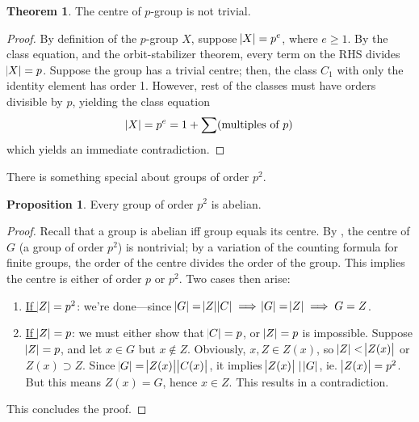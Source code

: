 \documentclass[11pt]{amsart} %
\theoremstyle{definition}
\newtheorem{proposition}[definition]{Proposition}
\newtheorem{theorem}[definition]{Theorem}
\theoremstyle{definition}
\numberwithin{equation}{section}
\begin{document}
\begin{theorem}
	\label{thmcentreofpgroupisnottrivial}
	The centre of $p$-group is not trivial.
\end{theorem}

\begin{proof}
	By definition of the $p$-group $X$, suppose $\abs{X} = p^e$, where $e \geq 1$. By the class equation, and the orbit-stabilizer theorem, every term on the RHS divides $\abs{X} = p$. Suppose the group has a trivial centre; then, the class $C_1$ with only the identity element has order 1. However, rest of the classes must have orders divisible by $p$, yielding the class equation
	\begin{align*}
	\abs{X} = p^e = 1 + \sum (\text{multiples of } p)
	\end{align*}
	which yields an immediate contradiction.
\end{proof}

There is something special about groups of order $p^2$.

\begin{proposition}
	\label{propgroupp2abelian}
	Every group of order $p^2$ is abelian.
\end{proposition}

\begin{proof}
	Recall that a group is abelian iff group equals its centre. By , the centre of $G$ (a group of order $p^2$) is nontrivial; by a variation of the counting formula for finite groups, the order of the centre divides the order of the group. This implies the centre is either of order $p$ or $p^2$. Two cases then arise:
	
	\begin{enumerate}
		\item \uline{If $\abs{Z} = p^2$}: we're done---since $\abs{G} = \abs{Z} \abs{C} \implies \abs{G} = \abs{Z} \implies G=Z$.
		
		\item \uline{If $\abs{Z} = p$}: we must either show that $\abs{C} = p$, or $\abs{Z} = p$ is impossible. Suppose $\abs{Z} = p$, and let $x \in G$ but $x \notin Z$. Obviously, $x, Z \in Z(x)$, so $\abs{Z} < \abs{Z(x)}$ or $Z(x) \supset Z$. Since $\abs{G} = \abs{Z(x)} \abs{C(x)}$, it implies $\abs{Z(x)} \mid \abs{G}$, ie. $\abs{Z(x)} = p^2$. But this means $Z(x) =G$, hence $x \in Z$. This results in a contradiction.
	\end{enumerate}
	
	This concludes the proof.
\end{proof}
\end{document}
